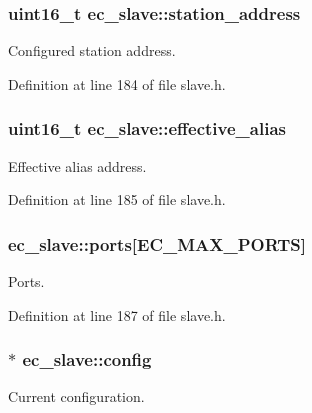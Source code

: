 \subsubsection[{station\-\_\-address}]{\setlength{\rightskip}{0pt plus 5cm}uint16\-\_\-t {\bf ec\-\_\-slave\-::station\-\_\-address}}\label{structec__slave_ae4c26b32979bcb21cf391ca3b170d701}


\-Configured station address. 



\-Definition at line 184 of file slave.\-h.

\subsubsection[{effective\-\_\-alias}]{\setlength{\rightskip}{0pt plus 5cm}uint16\-\_\-t {\bf ec\-\_\-slave\-::effective\-\_\-alias}}\label{structec__slave_a954d95e8464b5dcb7084463d00760291}


\-Effective alias address. 



\-Definition at line 185 of file slave.\-h.

\subsubsection[{ports}]{ {\bf ec\-\_\-slave\-::ports}[{\bf \-E\-C\-\_\-\-M\-A\-X\-\_\-\-P\-O\-R\-T\-S}]}\label{structec__slave_a0dc49f089a749f49fcce90007063ed85}


\-Ports. 



\-Definition at line 187 of file slave.\-h.

\subsubsection[{config}]{$\ast$ {\bf ec\-\_\-slave\-::config}}\label{structec__slave_a35616766fc7afbd4fc0b8a5d5a652bf7}


\-Current configuration. 



